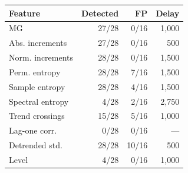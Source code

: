 \begin{tabular}{lrrr}
\toprule
Feature & Detected & FP & Delay \\
\midrule
MG & 27/28 & 0/16 & 1,000 \\
Abs. increments & 27/28 & 0/16 & 500 \\
Norm. increments & 28/28 & 0/16 & 1,500 \\
Perm. entropy & 28/28 & 7/16 & 1,500 \\
Sample entropy & 28/28 & 4/16 & 1,500 \\
Spectral entropy & 4/28 & 2/16 & 2,750 \\
Trend crossings & 15/28 & 5/16 & 1,000 \\
Lag-one corr. & 0/28 & 0/16 & --- \\
Detrended std. & 28/28 & 10/16 & 500 \\
Level & 4/28 & 0/16 & 1,000 \\
\bottomrule
\end{tabular}
